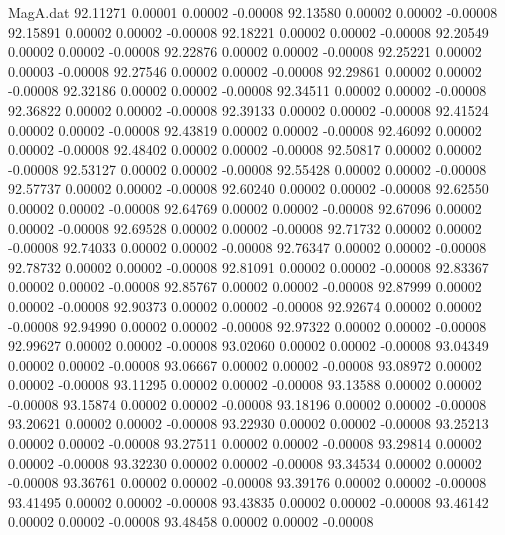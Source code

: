 \begin{filecontents}{MagA.dat}
  92.11271    0.00001    0.00002   -0.00008
  92.13580    0.00002    0.00002   -0.00008
  92.15891    0.00002    0.00002   -0.00008
  92.18221    0.00002    0.00002   -0.00008
  92.20549    0.00002    0.00002   -0.00008
  92.22876    0.00002    0.00002   -0.00008
  92.25221    0.00002    0.00003   -0.00008
  92.27546    0.00002    0.00002   -0.00008
  92.29861    0.00002    0.00002   -0.00008
  92.32186    0.00002    0.00002   -0.00008
  92.34511    0.00002    0.00002   -0.00008
  92.36822    0.00002    0.00002   -0.00008
  92.39133    0.00002    0.00002   -0.00008
  92.41524    0.00002    0.00002   -0.00008
  92.43819    0.00002    0.00002   -0.00008
  92.46092    0.00002    0.00002   -0.00008
  92.48402    0.00002    0.00002   -0.00008
  92.50817    0.00002    0.00002   -0.00008
  92.53127    0.00002    0.00002   -0.00008
  92.55428    0.00002    0.00002   -0.00008
  92.57737    0.00002    0.00002   -0.00008
  92.60240    0.00002    0.00002   -0.00008
  92.62550    0.00002    0.00002   -0.00008
  92.64769    0.00002    0.00002   -0.00008
  92.67096    0.00002    0.00002   -0.00008
  92.69528    0.00002    0.00002   -0.00008
  92.71732    0.00002    0.00002   -0.00008
  92.74033    0.00002    0.00002   -0.00008
  92.76347    0.00002    0.00002   -0.00008
  92.78732    0.00002    0.00002   -0.00008
  92.81091    0.00002    0.00002   -0.00008
  92.83367    0.00002    0.00002   -0.00008
  92.85767    0.00002    0.00002   -0.00008
  92.87999    0.00002    0.00002   -0.00008
  92.90373    0.00002    0.00002   -0.00008
  92.92674    0.00002    0.00002   -0.00008
  92.94990    0.00002    0.00002   -0.00008
  92.97322    0.00002    0.00002   -0.00008
  92.99627    0.00002    0.00002   -0.00008
  93.02060    0.00002    0.00002   -0.00008
  93.04349    0.00002    0.00002   -0.00008
  93.06667    0.00002    0.00002   -0.00008
  93.08972    0.00002    0.00002   -0.00008
  93.11295    0.00002    0.00002   -0.00008
  93.13588    0.00002    0.00002   -0.00008
  93.15874    0.00002    0.00002   -0.00008
  93.18196    0.00002    0.00002   -0.00008
  93.20621    0.00002    0.00002   -0.00008
  93.22930    0.00002    0.00002   -0.00008
  93.25213    0.00002    0.00002   -0.00008
  93.27511    0.00002    0.00002   -0.00008
  93.29814    0.00002    0.00002   -0.00008
  93.32230    0.00002    0.00002   -0.00008
  93.34534    0.00002    0.00002   -0.00008
  93.36761    0.00002    0.00002   -0.00008
  93.39176    0.00002    0.00002   -0.00008
  93.41495    0.00002    0.00002   -0.00008
  93.43835    0.00002    0.00002   -0.00008
  93.46142    0.00002    0.00002   -0.00008
  93.48458    0.00002    0.00002   -0.00008

\end{filecontents}
